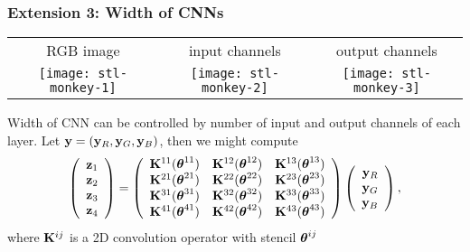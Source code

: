 \documentclass[12pt,fleqn,handout]{beamer}
\begin{document}
\begin{frame}\frametitle{Extension 3: Width of CNNs}
	
	\begin{center}
		\begin{tabular}{ccc}
			RGB image & input channels & output channels\\ 
			\texttt{[image: stl-monkey-1]}
			&
			\texttt{[image: stl-monkey-2]}
			&
			\texttt{[image: stl-monkey-3]}
		\end{tabular}
	\end{center}
	\pause
	
	Width of CNN can be controlled by number of input and output channels of each layer. Let ${\bf y} = ({\bf y}_R, {\bf y}_G, {\bf y}_B)$, then we might compute
	$$
		\left(
			\begin{array}{r}
				{\bf z}_1 \\
				{\bf z}_2 \\
				{\bf z}_3 \\
				{\bf z}_4
			\end{array}
		\right)
		= 
		\left(
		\begin{array}{rrr}
			{\bf K}^{11}({\boldsymbol \theta}^{11}) &  {\bf K}^{12}({\boldsymbol \theta}^{12}) & {\bf K}^{13}({\boldsymbol \theta}^{13})\\
			{\bf K}^{21}({\boldsymbol \theta}^{21}) &  {\bf K}^{22}({\boldsymbol \theta}^{22}) & {\bf K}^{23}({\boldsymbol \theta}^{23})\\
			{\bf K}^{31}({\boldsymbol \theta}^{31}) &  {\bf K}^{32}({\boldsymbol \theta}^{32}) & {\bf K}^{33}({\boldsymbol \theta}^{33})\\
			{\bf K}^{41}({\boldsymbol \theta}^{41}) &  {\bf K}^{42}({\boldsymbol \theta}^{42}) & {\bf K}^{43}({\boldsymbol \theta}^{43})\\
		\end{array}
		\right)
		\left(
			\begin{array}{r}
				{\bf y}_R \\
				{\bf y}_G \\
				{\bf y}_B 
			\end{array}
		\right),
	$$
	where ${\bf K}^{ij}$ is a 2D convolution operator with stencil ${\boldsymbol \theta}^{ij}$
	
\end{frame}
\end{document}
